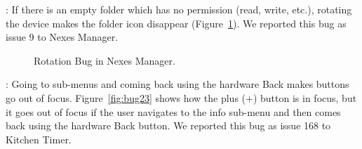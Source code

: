 : If there is an empty folder which has no permission (read, write, etc.), rotating the device makes the folder icon disappear (Figure~\ref{fig:bug10}). We reported this bug as issue 9 to Nexes Manager.
\begin{figure}[!t]
\centering
\begin{minipage}{.5\columnwidth}
\hfill
{}
\caption{Rotation Bug in Nexes Manager.}
\label{fig:bug10}
\end{minipage}
\end{figure}

: Going to sub-menus and coming back using the hardware Back makes buttons go out of focus. Figure~\ref{fig:bug23} shows how the plus ($+$) button is in focus, but it goes out of focus if the user navigates to the info sub-menu and then comes back using the hardware Back button. We reported this bug as issue 168 to Kitchen Timer.


